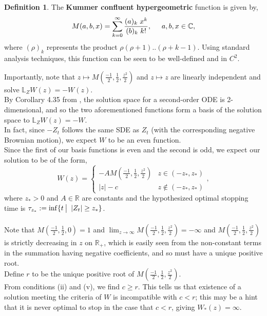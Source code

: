 \documentclass[12pt]{article}
\newcommand{\R}{\mathbb{R}}
\newcommand{\C}{\mathbb{C}}
\newcommand{\bL}{\mathbb{L}}
\newcommand{\quantifyspace}{\hspace{2px} \big | \hspace{5px}}
\newcommand{\spc}{\hspace{7 px}}
\newcommand{\sspc}{\hspace{3 px}}
\theoremstyle{definition}
\newtheorem{defn}{Definition}
\begin{document}
\begin{defn}
    The \textbf{Kummer confluent hypergeometric} function is given by,
    \[
        M(a, b, x) = \sum_{k=0}^\infty \frac{(a)_k \sspc x^k}{(b)_k \sspc k!}, \spc \spc a,b,x \in \C,
    \]
    where $(\rho)_k$ represents the product $\rho (\rho + 1) .. (\rho + k - 1)$. Using standard analysis techniques, this function can be seen to be well-defined and in $C^2$.
\end{defn}

Importantly, note that $z \mapsto M(\frac{-1}{2}, \frac{1}{2}, \frac{z^2}{2})$ and $z \mapsto z$ are linearly independent and solve $\bL_Z W(z) = -W(z)$. \\
By Corollary 4.35 from \cite{arbogast2025}, the solution space for a second-order ODE is 2-dimensional, and so the two aforementioned functions form a basis of the solution space to $\bL_Z W(z) = -W$. \\
In fact, since $-Z_t$ follows the same SDE as $Z_t$ (with the corresponding negative Brownian motion), we expect $W$ to be an even function. \\
Since the first of our basis functions is even and the second is odd, we expect our solution to be of the form,
\[
    W(z) = \begin{cases}
        - A M(\frac{-1}{2}, \frac{1}{2}, \frac{z^2}{2}) & z \in (-z_*, z_*) \\
        |z| - c & z \not \in (-z_*, z_*)
    \end{cases},
\]
where $z_* > 0$ and $A \in \R$ are constants and the hypothesized optimal stopping time is $\tau_{z_*} := \inf \{t \quantifyspace |Z_t| \geq z_* \}$. \\
\\
Note that $M(\frac{-1}{2}, \frac{1}{2}, 0) = 1$ and $\lim_{z \to \infty} M(\frac{-1}{2}, \frac{1}{2}, \frac{z^2}{2}) = - \infty$ and $M(\frac{-1}{2}, \frac{1}{2}, \frac{z^2}{2})$ is strictly decreasing in $z$ on $\R_+$, which is easily seen from the non-constant terms in the summation having negative coefficients, and so must have a unique positive root. \\
Define $r$ to be the unique positive root of $M(\frac{-1}{2}, \frac{1}{2}, \frac{z^2}{2})$. \\
From conditions (ii) and (v), we find $c \geq r$. This tells us that existence of a solution meeting the criteria of $W$ is incompatible with $c < r$; this may be a hint that it is never optimal to stop in the case that $c < r$, giving $W_*(z) = \infty$. \\
\end{document}
